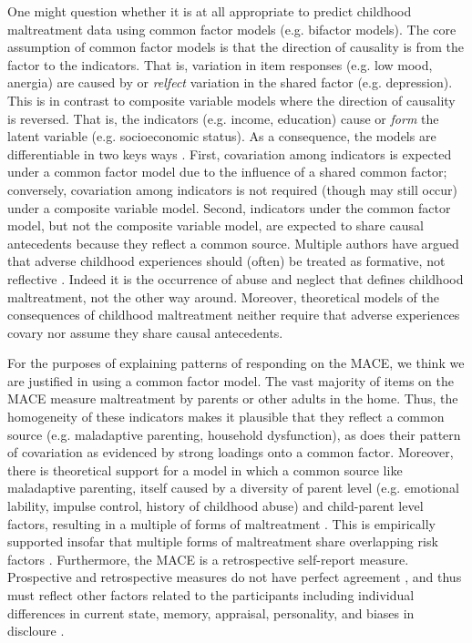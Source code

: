 \documentclass[letterpaper,man,natbib,floatsintext,longtable]{apa6}
\begin{document}
One might question whether it is at all appropriate to predict childhood maltreatment data using common factor models (e.g. bifactor models). The core assumption of common factor models is that the direction of causality is from the factor to the indicators. That is, variation in item responses (e.g. low mood, anergia) are caused by or \emph{relfect} variation in the shared factor (e.g. depression). This is in contrast to composite variable models where the direction of causality is reversed. That is, the indicators (e.g. income, education) cause or \emph{form} the latent variable (e.g. socioeconomic status). As a consequence, the models are differentiable in two keys ways \citep{bollen1991conventional, bollen2011three}. First, covariation among indicators is expected under a common factor model due to the influence of a shared common factor; conversely, covariation among indicators is not required (though may still occur) under a composite variable model. Second, indicators under the common factor model, but not the composite variable model, are expected to share causal antecedents because they reflect a common source. Multiple authors have argued that adverse childhood experiences should (often) be treated as formative, not reflective \citep{netland2001assessment, layne2010unpacking}. Indeed it is the occurrence of abuse and neglect that defines childhood maltreatment, not the other way around. Moreover, theoretical models of the consequences of childhood maltreatment neither require that adverse experiences covary nor assume they share causal antecedents. 

For the purposes of explaining patterns of responding on the MACE, we think we are justified in using a common factor model. The vast majority of items on the MACE measure maltreatment by parents or other adults in the home. Thus, the homogeneity of these indicators makes it plausible that they reflect a common source (e.g. maladaptive parenting, household dysfunction), as does their pattern of covariation as evidenced by strong loadings onto a common factor. Moreover, there is theoretical support for a model in which a common source like maladaptive parenting, itself caused by a diversity of parent level (e.g. emotional lability, impulse control, history of childhood abuse) and child-parent level factors, resulting in a multiple of forms of maltreatment \citep{belsky1993etiology}. This is empirically supported insofar that multiple forms of maltreatment share overlapping risk factors \citep{stith2009risk, mulder2018risk, assink2019risk}. Furthermore, the MACE is a retrospective self-report measure. Prospective and retrospective measures do not have perfect agreement \citep{patten2015retrospective, reuben2016lest}, and thus must reflect other factors related to the participants including individual differences in current state, memory, appraisal, personality, and biases in discloure \citep{susser2012still, reuben2016lest, colman2016consistency}. 
\end{document}
